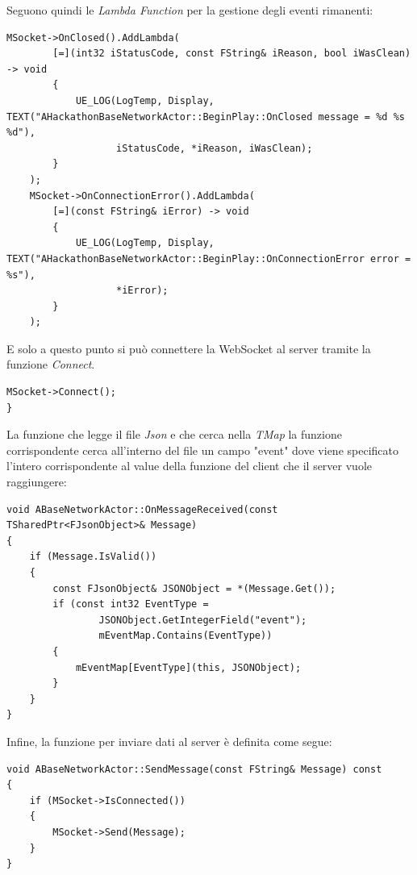 Seguono quindi le \textit{Lambda Function} per la gestione degli eventi rimanenti:

\begin{lstlisting}[firstnumber=24, caption=Lambda function per la gestione della chiusura della connessione e dell'errore durante la connessione]
	MSocket->OnClosed().AddLambda(
		[=](int32 iStatusCode, const FString& iReason, bool iWasClean) -> void
		{
			UE_LOG(LogTemp, Display, TEXT("AHackathonBaseNetworkActor::BeginPlay::OnClosed message = %d %s %d"),
			       iStatusCode, *iReason, iWasClean);
		}
	);
	MSocket->OnConnectionError().AddLambda(
		[=](const FString& iError) -> void
		{
			UE_LOG(LogTemp, Display, TEXT("AHackathonBaseNetworkActor::BeginPlay::OnConnectionError error = %s"),
			       *iError);
		}
	);
\end{lstlisting}

E solo a questo punto si può connettere la WebSocket al server tramite la funzione \textit{Connect}. 
\begin{lstlisting}[firstnumber=38, caption = Connessione della WebSocket]
	MSocket->Connect();
}
\end{lstlisting}

La funzione che legge il file \textit{Json} e che cerca nella \textit{TMap} la funzione corrispondente cerca all'interno del file un campo "event" dove viene specificato l'intero corrispondente al value della funzione del client che il server vuole raggiungere:

\begin{lstlisting}[caption = funzione che gestisce la ricezione del messaggio in ABaseNetworkActor]
void ABaseNetworkActor::OnMessageReceived(const TSharedPtr<FJsonObject>& Message)
{
    if (Message.IsValid())
    {
        const FJsonObject& JSONObject = *(Message.Get());
        if (const int32 EventType = 
                JSONObject.GetIntegerField("event"); 
                mEventMap.Contains(EventType))
        {
            mEventMap[EventType](this, JSONObject);
        }
    }
}    
\end{lstlisting}

Infine, la funzione per inviare dati al server è definita come segue:

\begin{lstlisting}[caption = Funzione per inviare dati al server attraverso la WebSocket]
void ABaseNetworkActor::SendMessage(const FString& Message) const
{
    if (MSocket->IsConnected())
    {
        MSocket->Send(Message);
    }
}
\end{lstlisting}

